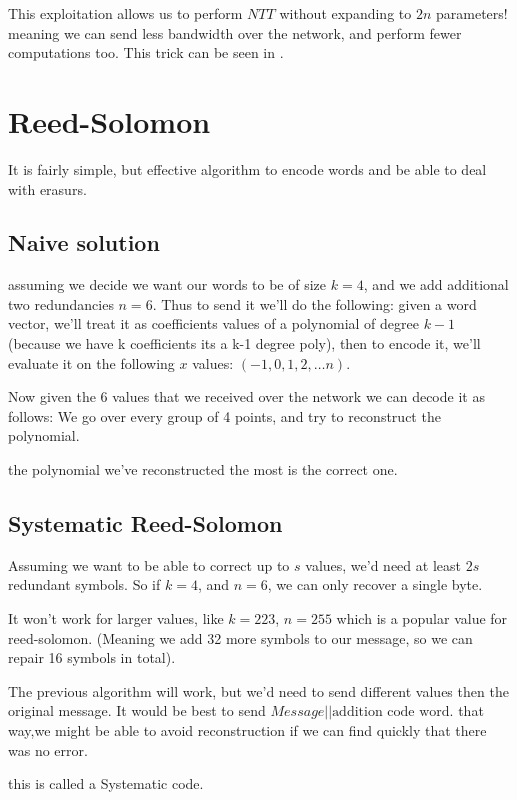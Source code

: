 This exploitation allows us to perform $NTT$ without expanding to $2n$ parameters!
meaning we can send less bandwidth over the network, and perform fewer computations too. 
This trick can be seen in \cite{SEAL}.

\section{Reed-Solomon}
It is fairly simple, but effective algorithm to encode words and be able to deal with erasurs.
\subsection{Naive solution}
assuming we decide we want our words to be of size $k=4$, and we add additional two redundancies $n=6$. 
Thus to send it we'll do the following: given a word vector, we'll treat it as coefficients values of a 
polynomial of degree $k-1$ (because we have k coefficients its a k-1 degree poly), then to encode it, we'll evaluate it on the following $x$ values: $(-1,0,1,2,\dots n)$.


Now given the 6 values that we received over the network we can decode it as follows: 
We go over every group of 4 points, and try to reconstruct the polynomial. 

the polynomial we've reconstructed the most is the correct one.

\subsection{Systematic Reed-Solomon}
Assuming we want to be able to correct up to $s$ values, we'd need at least $2s$ redundant symbols.
So if $k=4$, and $n=6$, we can only recover a single byte.

It won't work for larger values, like $k=223$, $n=255$ which is a popular value for reed-solomon.
(Meaning we add 32 more symbols to our message, so we can repair 16 symbols in total).

The previous algorithm will work, but we'd need to send different values then 
the original message. It would be best to send $Message||\text{addition code word}$.
that way,we might be able to avoid reconstruction if we can find quickly that there was no error.

this is called a Systematic code. 
